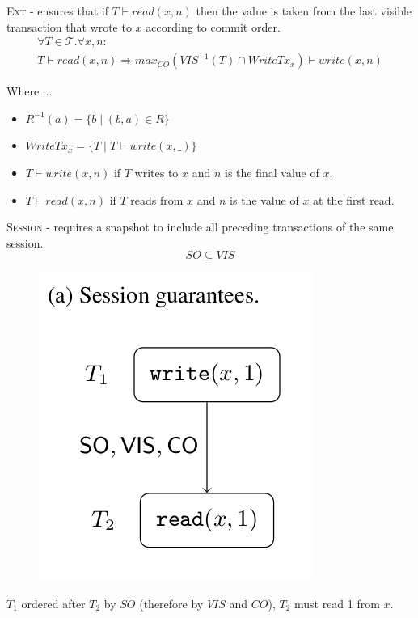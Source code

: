 \documentclass{beamer}
\begin{document}
\begin{frame}
	\begin{definition}
		\textsc{Ext} - ensures that if $T\vdash read(x,n)$ then the value is taken from the last visible transaction that wrote to $x$ according to commit order.
		\begin{multline*}
			\forall T \in \mathcal{T} . \forall x, n: \\
			T \vdash read(x,n) \Rightarrow
			max_{CO}\left( VIS^{-1}\left( T \right) \cap WriteTx_x \right) \vdash write(x,n)
		\end{multline*}
	\end{definition}
	Where ...
	\begin{itemize}
		\item $R^{-1}(a) = \{ b \mid (b, a) \in R \}$
		\item $ WriteTx_x = \{ T \mid T \vdash write(x,\_)\}$
		\item $ T \vdash write(x,n) $ if $T$ writes to $x$ and $n$ is the final value of $x$.
		\item $ T \vdash read(x,n)$ if $T$ reads from $x$ and $n$ is the value of $x$ at the first read.
	\end{itemize}
\end{frame}

\begin{frame}
	\begin{definition}
		\textsc{Session} - requires a snapshot to include all preceding transactions of the same session.
		$$ SO \subseteq VIS $$
	\end{definition}
\end{frame}

\begin{frame}
	\begin{figure}
		\includegraphics[scale=0.3]{fig2a}
	\end{figure}
	\begin{example}
		$T_1$ ordered after $T_2$ by $SO$ (therefore by $VIS$ and $CO$), $T_2$ must read 1 from $x$.
	\end{example}
\end{frame}
\end{document}
